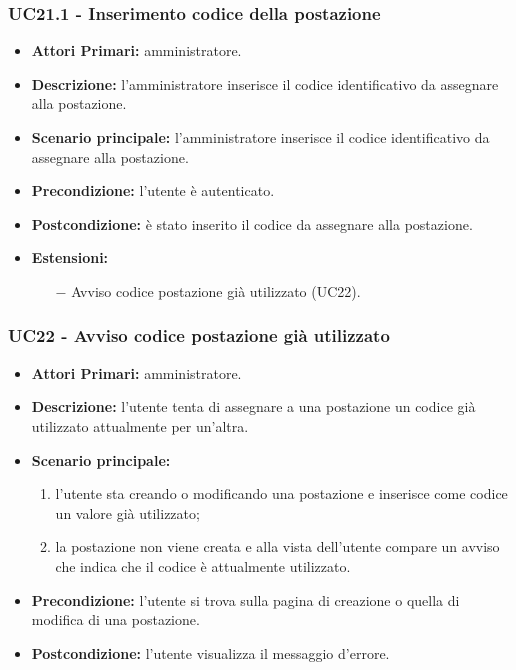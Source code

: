 \subsubsection{UC21.1 - Inserimento codice della postazione}
\begin{itemize}
	\item\textbf{Attori Primari:}
	amministratore.
	\item\textbf{Descrizione:}
	l'amministratore inserisce il codice identificativo da assegnare alla postazione.
	\item\textbf{Scenario principale:} 
	l'amministratore inserisce il codice identificativo da assegnare alla postazione.
	\item\textbf{Precondizione:} 
	l'utente è autenticato.
	\item\textbf{Postcondizione:}
	è stato inserito il codice da assegnare alla postazione.
	\item\textbf{Estensioni:}
	\begin{itemize}
		\item[$-$] Avviso codice postazione già utilizzato (UC22).
	\end{itemize}
\end{itemize}
\subsubsection{UC22 - Avviso codice postazione già utilizzato}
\begin{itemize}
	\item\textbf{Attori Primari:}
	amministratore.
	\item\textbf{Descrizione:}
	l'utente tenta di assegnare a una postazione un codice già utilizzato attualmente per un'altra.
	\item\textbf{Scenario principale:}
	\begin{enumerate}
		\item l'utente sta creando o modificando una postazione e inserisce come codice un valore già utilizzato;
		\item la postazione non viene creata e alla vista dell'utente compare un avviso che indica che il codice è attualmente utilizzato.
	\end{enumerate}
	\item\textbf{Precondizione:}
	l'utente si trova sulla pagina di creazione o quella di modifica di una postazione.
	\item\textbf{Postcondizione:}
	l'utente visualizza il messaggio d'errore.
\end{itemize}

